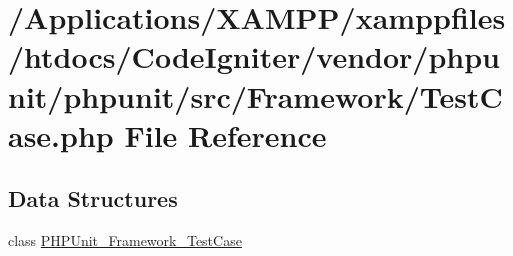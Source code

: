 \hypertarget{phpunit_2src_2_framework_2_test_case_8php}{}\section{/\+Applications/\+X\+A\+M\+P\+P/xamppfiles/htdocs/\+Code\+Igniter/vendor/phpunit/phpunit/src/\+Framework/\+Test\+Case.php File Reference}
\label{phpunit_2src_2_framework_2_test_case_8php}
\subsection*{Data Structures}
\begin{DoxyCompactItemize}
\item 
class \mbox{\hyperlink{class_p_h_p_unit___framework___test_case}{P\+H\+P\+Unit\+\_\+\+Framework\+\_\+\+Test\+Case}}
\end{DoxyCompactItemize}
